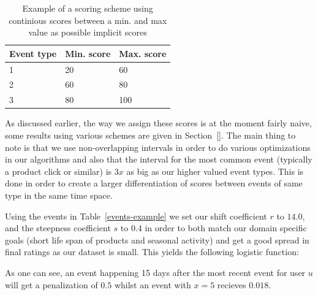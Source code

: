 \begin{table}[H]
  \centering
  \begin{tabular}{lll}
    \toprule
    Event type & Min. score & Max. score \\
    \midrule
    1 & 20 & 60 \\
    2 & 60 & 80 \\
    3 & 80 & 100 \\
    \bottomrule
  \end{tabular}
  \caption{Example of a scoring scheme using continious scores between a min.
  and max value as possible implicit scores}
  \label{implicit-example-scores}
\end{table}

As discussed earlier, the way we assign these scores is at the moment fairly
naive, some results using various schemes are given in Section~\ref{}. The main
thing to note is that we use non-overlapping intervals in order to do various
optimizations in our algorithms and also that the interval for the most common
event (typically a product click or similar) is $3x$ as big as our higher
valued event types. This is done in order to create a larger differentiation
of scores between events of same type in the same time space.

Using the events in Table~\ref{events-example} we set our shift coefficient $r$
to $14.0$, and the steepness coefficient $s$ to $0.4$ in order to both match
our domain specific goals (short life span of products and seasonal activity)
and get a good spread in final ratings as our dataset is small. This yields the
following logistic function:

\begin{figure}[h!]
  \centering
\end{figure}

As one can see, an event happening 15 days after the most recent event for user
$u$ will get a penalization of $0.5$ whilst an event with $x=5$ recieves
$0.018$. 

